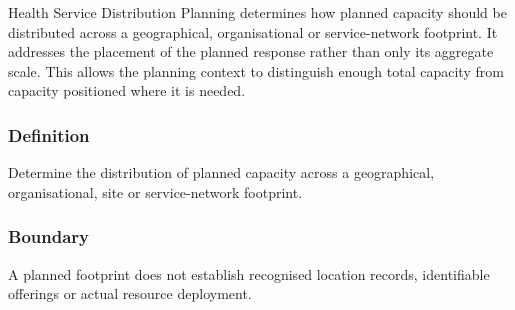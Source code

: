 Health Service Distribution Planning determines how planned capacity should be distributed across a geographical, organisational or service-network footprint. It addresses the placement of the planned response rather than only its aggregate scale. This allows the planning context to distinguish enough total capacity from capacity positioned where it is needed.

\subsubsection*{Definition}

Determine the distribution of planned capacity across a geographical, organisational, site or service-network footprint.

\subsubsection*{Boundary}

A planned footprint does not establish recognised location records, identifiable offerings or actual resource deployment.

